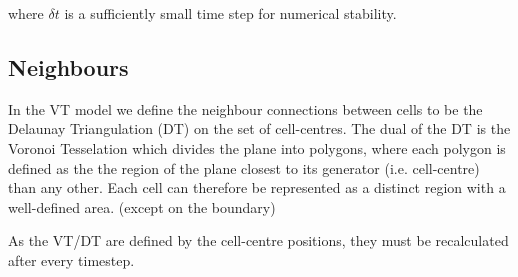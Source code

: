 \documentclass[a4paper]{article}
\begin{document}
where $\delta t$ is a sufficiently small time step for numerical stability.
\subsection{Neighbours}
In the VT model we define the neighbour connections between cells to be the Delaunay Triangulation (DT) on the set of cell-centres. The dual of the DT is the Voronoi Tesselation which divides the plane into polygons, where each polygon is defined as the the region of the plane closest to its generator (i.e. cell-centre) than any other. Each cell can therefore be represented as a distinct region with a well-defined area. (except on the boundary) 

As the VT/DT are defined by the cell-centre positions, they must be recalculated after every timestep.
\end{document}
